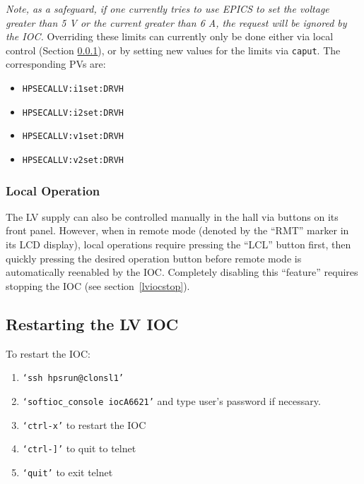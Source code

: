 \documentclass[12pt]{article}
\begin{document}
{{\em Note, as a safeguard, if one currently tries to use EPICS to set the voltage greater than 5 V or the current greater than 6 A, the request will be ignored by the IOC.}  Overriding these limits can currently only be done either via local control (Section \ref{sec:lvlocalops}), or by setting new values for the limits via \texttt{caput}.  The corresponding PVs are:
\begin{itemize}
    \item\texttt{HPSECALLV:i1set:DRVH}
    \item\texttt{HPSECALLV:i2set:DRVH}
    \item\texttt{HPSECALLV:v1set:DRVH}
    \item\texttt{HPSECALLV:v2set:DRVH}
\end{itemize}

\subsubsection{Local Operation}\label{sec:lvlocalops}
The LV supply can also be controlled manually in the hall via buttons on its front panel.  However, when in remote mode (denoted by the ``RMT'' marker in its LCD display), local operations require pressing the ``LCL'' button first, then quickly pressing the desired operation button before remote mode is automatically reenabled by the IOC.  Completely disabling this ``feature'' requires stopping the IOC (see section~\ref{lviocstop}).

\newpage
\subsection{Restarting the LV IOC}
   To restart the IOC:
   {\footnotesize
   \begin{enumerate}
       \item \texttt{`ssh hpsrun@clonsl1'}
       \item \texttt{`softioc\_console iocA6621'} and type user's password if necessary.
       \item \texttt{`ctrl-x'} to restart the IOC
       \item \texttt{`ctrl-]'} to quit to telnet
       \item \texttt{`quit'} to exit telnet
   \end{enumerate}
   }

}
\end{document}
